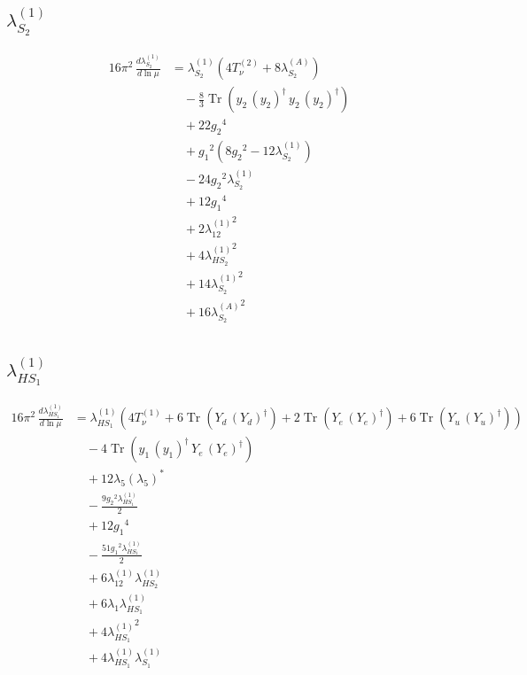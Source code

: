 \documentclass[10pt,a4paper]{article}
\begin{document}
\subsection*{$\lambda_{S_2}^{(1)}$}
\begin{align*}
16\pi^2\,\frac{d \lambda_{S_2}^{(1)}}{d\ln\mu} &={\lambda_{S_2}^{(1)}} (4 T_{\nu}^{(2)}+8 {\lambda_{S_2}^{(A)}}) \\
&\quad -\frac{8}{3} \operatorname{Tr}\!\left({y_2}\,\left({y_2}\right)^{\dagger}\,{y_2}\,\left({y_2}\right)^{\dagger}\right) \\
&\quad +22 {g_2}^4 \\
&\quad +{g_1}^2 \left(8 {g_2}^2-12 {\lambda_{S_2}^{(1)}}\right) \\
&\quad -24 {g_2}^2 {\lambda_{S_2}^{(1)}} \\
&\quad +12 {g_1}^4 \\
&\quad +2 {\lambda_{12}^{(1)}}^2 \\
&\quad +4 {\lambda_{HS_2}^{(1)}}^2 \\
&\quad +14 {\lambda_{S_2}^{(1)}}^2 \\
&\quad +16 {\lambda_{S_2}^{(A)}}^2 \\
\end{align*}
\subsection*{$\lambda_{HS_1}^{(1)}$}
\begin{align*}
16\pi^2\,\frac{d \lambda_{HS_1}^{(1)}}{d\ln\mu} &={\lambda_{HS_1}^{(1)}} (4 T_{\nu}^{(1)}+6 \operatorname{Tr}\!\left({Y_d}\,\left({Y_d}\right)^{\dagger}\right)+2 \operatorname{Tr}\!\left({Y_e}\,\left({Y_e}\right)^{\dagger}\right)+6 \operatorname{Tr}\!\left({Y_u}\,\left({Y_u}\right)^{\dagger}\right)) \\
&\quad -4 \operatorname{Tr}\!\left({y_1}\,\left({y_1}\right)^{\dagger}\,{Y_e}\,\left({Y_e}\right)^{\dagger}\right) \\
&\quad +12 {\lambda_5} \left({\lambda_5}\right)^{*} \\
&\quad -\frac{9 {g_2}^2 {\lambda_{HS_1}^{(1)}}}{2} \\
&\quad +12 {g_1}^4 \\
&\quad -\frac{51 {g_1}^2 {\lambda_{HS_1}^{(1)}}}{2} \\
&\quad +6 {\lambda_{12}^{(1)}} {\lambda_{HS_2}^{(1)}} \\
&\quad +6 {\lambda_1} {\lambda_{HS_1}^{(1)}} \\
&\quad +4 {\lambda_{HS_1}^{(1)}}^2 \\
&\quad +4 {\lambda_{HS_1}^{(1)}} {\lambda_{S_1}^{(1)}} \\
\end{align*}
\end{document}
